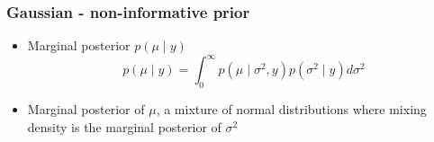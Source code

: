 \documentclass[10pt]{beamer}
\begin{document}
\begin{frame}
  \frametitle{Gaussian - non-informative prior}

 \begin{itemize}
  \item Marginal posterior $p(\mu \mid y)$
   \begin{equation*}
     p(\mu \mid y)=\int_0^\infty p(\mu \mid \sigma^2,y)p(\sigma^2 \mid y)d\sigma^2
    \end{equation*}
   \item Marginal posterior of $\mu$, a mixture of normal
     distributions where mixing density is the marginal posterior of
      $\sigma^2$
\end{itemize}

\end{frame}

\begin{frame}


\end{frame}
\end{document}

